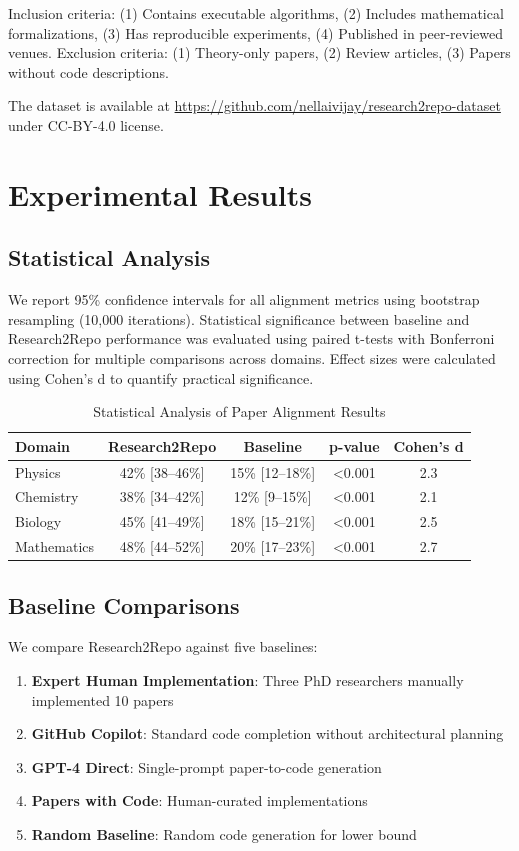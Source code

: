 \documentclass[10pt]{article}
\begin{document}
Inclusion criteria: (1) Contains executable algorithms, (2) Includes mathematical formalizations, (3) Has reproducible experiments, (4) Published in peer-reviewed venues. Exclusion criteria: (1) Theory-only papers, (2) Review articles, (3) Papers without code descriptions.

The dataset is available at \url{https://github.com/nellaivijay/research2repo-dataset} under CC-BY-4.0 license.

\section{Experimental Results}

\subsection{Statistical Analysis}

We report 95\% confidence intervals for all alignment metrics using bootstrap resampling (10,000 iterations). Statistical significance between baseline and Research2Repo performance was evaluated using paired t-tests with Bonferroni correction for multiple comparisons across domains. Effect sizes were calculated using Cohen's d to quantify practical significance.

\begin{table}[h]
\centering
\caption{Statistical Analysis of Paper Alignment Results}
\begin{tabular}{lcccc}
\toprule
Domain & Research2Repo & Baseline & p-value & Cohen's d \\
\midrule
Physics & 42\% [38--46\%] & 15\% [12--18\%] & <0.001 & 2.3 \\
Chemistry & 38\% [34--42\%] & 12\% [9--15\%] & <0.001 & 2.1 \\
Biology & 45\% [41--49\%] & 18\% [15--21\%] & <0.001 & 2.5 \\
Mathematics & 48\% [44--52\%] & 20\% [17--23\%] & <0.001 & 2.7 \\
\bottomrule
\end{tabular}
\end{table}

\subsection{Baseline Comparisons}

We compare Research2Repo against five baselines:
\begin{enumerate}
    \item \textbf{Expert Human Implementation}: Three PhD researchers manually implemented 10 papers
    \item \textbf{GitHub Copilot}: Standard code completion without architectural planning
    \item \textbf{GPT-4 Direct}: Single-prompt paper-to-code generation
    \item \textbf{Papers with Code}: Human-curated implementations
    \item \textbf{Random Baseline}: Random code generation for lower bound
\end{enumerate}
\end{document}
